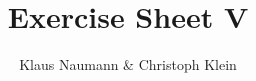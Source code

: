 \documentclass[oneside,a4paper]{scrartcl}
\begin{document}

\title{Exercise Sheet V}
\subject{Advanced Parallel Computing}
\author{Klaus Naumann \& Christoph Klein}
\maketitle
\end{document}

